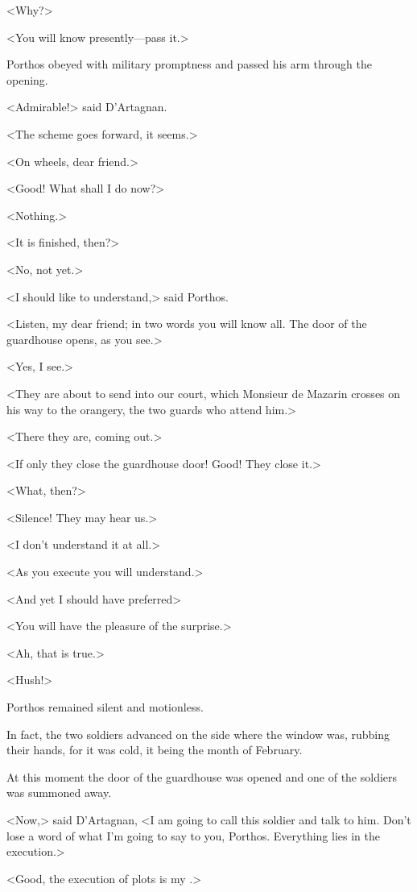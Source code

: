 <Why?>

<You will know presently—pass it.>

Porthos obeyed with military promptness and passed his arm through the opening.

<Admirable!> said D'Artagnan.

<The scheme goes forward, it seems.>

<On wheels, dear friend.>

<Good! What shall I do now?>

<Nothing.>

<It is finished, then?>

<No, not yet.>

<I should like to understand,> said Porthos.

<Listen, my dear friend; in two words you will know all. The door of the guardhouse opens, as you see.>

<Yes, I see.>

<They are about to send into our court, which Monsieur de Mazarin crosses on his way to the orangery, the two guards who attend him.>

<There they are, coming out.>

<If only they close the guardhouse door! Good! They close it.>

<What, then?>

<Silence! They may hear us.>

<I don't understand it at all.>

<As you execute you will understand.>

<And yet I should have preferred\longdash>

<You will have the pleasure of the surprise.>

<Ah, that is true.>

<Hush!>

Porthos remained silent and motionless.

In fact, the two soldiers advanced on the side where the window was, rubbing their hands, for it was cold, it being the month of February.

At this moment the door of the guardhouse was opened and one of the soldiers was summoned away.

<Now,> said D'Artagnan, <I am going to call this soldier and talk to him. Don't lose a word of what I'm going to say to you, Porthos. Everything lies in the execution.>

<Good, the execution of plots is my .>

